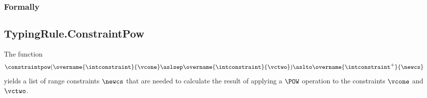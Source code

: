 \subsubsection{Formally}
\begin{mathpar}
\end{mathpar}

\begin{mathpar}
\end{mathpar}

\subsection{TypingRule.ConstraintPow\label{sec:TypingRule.ConstraintPow}}
\hypertarget{def-constraintpow}{}
The function
\[
\constraintpow(\overname{\intconstraint}{\vcone} \aslsep \overname{\intconstraint}{\vctwo}) \aslto \overname{\intconstraint^+}{\newcs}
\]
yields a list of range constraints $\newcs$ that are needed to calculate the result of
applying a $\POW$ operation to the constraints $\vcone$ and $\vctwo$.

